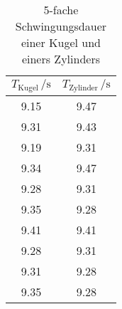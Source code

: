 \begin{table}
  \centering
  \caption{5-fache Schwingungsdauer einer Kugel und einers Zylinders}
  \label{tab:Kugel_Zylinder}
  \begin{tabular}{
  c c
  }
    \toprule
     $T_\text{Kugel}\, / \unit{\second}$ & $T_\text{Zylinder}\, / \unit{\second}$\\
    \midrule
    9.15 & 9.47 \\
    9.31 & 9.43 \\
    9.19 & 9.31 \\
    9.34 & 9.47 \\
    9.28 & 9.31 \\
    9.35 & 9.28 \\
    9.41 & 9.41 \\
    9.28 & 9.31 \\
    9.31 & 9.28 \\
    9.35 & 9.28 \\
    \bottomrule
  \end{tabular}
\end{table}